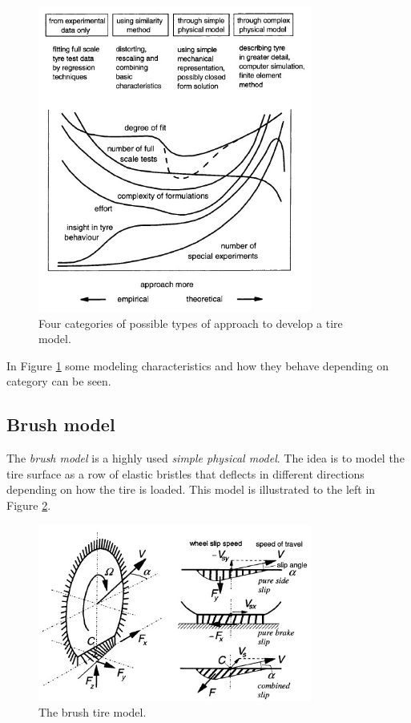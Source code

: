 \begin{figure}[h]
	\centering
	\includegraphics[width=0.8\textwidth]{Pictures/tire_modeling}
	\caption{Four categories of possible types of approach to develop a tire model. \cite{pacejka}}
	\label{tire_modeling}
\end{figure}

In Figure \ref{tire_modeling} some modeling characteristics and how they behave depending on category can be seen.

\subsection{Brush model}
\label{sec:brush}
The \textit{brush model} is a highly used \textit{simple physical model}. The idea is to model the tire surface as a row of elastic bristles that deflects in different directions depending on how the tire is loaded. This model is illustrated to the left in Figure \ref{brush1}.

\begin{figure}[h]
	\centering
	\includegraphics[width=0.8\textwidth]{Pictures/brush1}
	\caption{The brush tire model. \cite{pacejka}}
	\label{brush1}
\end{figure}


